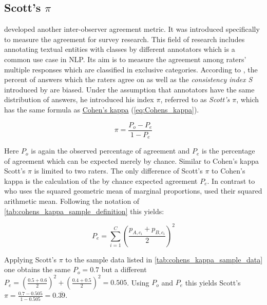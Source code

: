 \subsection{Scott's $\pi$}
\label{chp:fundamentals:sec:inter_rater_agreement:subsec:scotts_pi}
\textcite{Scott:1955} developed another inter-observer agreement metric.
It was introduced specifically to measure the agreement for survey research.
This field of research includes annotating textual entities with classes by different annotators which is a common use case in \ac{NLP}.
Its aim is to measure the agreement among raters' multiple responses which are classified in exclusive categories.
According to \textcite{Scott:1955}, the percent of answers which the raters agree on as well as the \textit{consistency index S} introduced by \textcite{Bennett:1954} are biased.
Under the assumption that annotators have the same distribution of answers, he introduced his index $\pi$, referred to as \textit{Scott's $\pi$}, which has the same formula as \hyperref[chp:fundamentals:sec:inter_rater_agreement:subsec:cohens_kappa]{Cohen's kappa} (\cref{eq:Cohens_kappa}).

\begin{equation}\label{eq:Scotts_pi}
    \pi = \frac{P_o - P_e}{1 - P_e}
\end{equation}

Here $P_o$ is again the observed percentage of agreement and $P_e$ is the percentage of agreement which can be expected merely by chance.
Similar to Cohen's kappa Scott's $\pi$ is limited to two raters.
The only difference of Scott's $\pi$ to Cohen's kappa is the calculation of the by chance expected agreement $P_e$.
In contrast to \textcite{Cohen:1960} who uses the squared geometric mean of marginal proportions, \textcite{Scott:1955} used their squared arithmetic mean.
Following the notation of \cref{tab:cohens_kappa_sample_definition} this yields:

\begin{equation}\label{eq:Cohens_kappa:p_e}
    P_e = \sum_{i=1}^{C} (\frac{p_{A, c_i} + p_{B, c_i}}{2})^2
\end{equation}

Applying Scott's $\pi$ to the sample data listed in \cref{tab:cohens_kappa_sample_data} one obtains the same $P_o=0.7$ but a different $P_e = (\frac{0.5 + 0.6}{2})^2 + (\frac{0.4+0.5}{2})^2 = 0.505$.
Using $P_o$ and $P_e$ this yields Scott's $\pi = \frac{0.7 - 0.505}{1-0.505} = 0.\overline{39}$.
